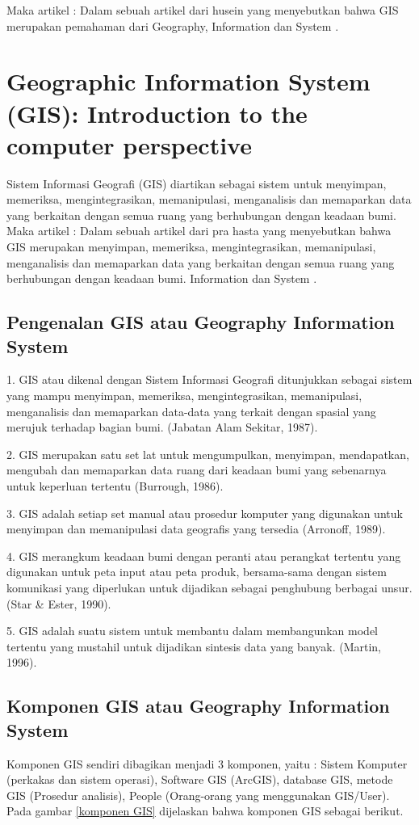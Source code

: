 Maka artikel :
	Dalam sebuah artikel dari husein yang menyebutkan bahwa  GIS merupakan pemahaman dari
	Geography, Information dan System \cite{husein2006konsep}.

\section{Geographic Information System (GIS): Introduction to the computer perspective}
Sistem Informasi Geografi (GIS) diartikan sebagai sistem untuk menyimpan, memeriksa, 
mengintegrasikan, memanipulasi, menganalisis dan memaparkan data yang berkaitan dengan semua 
ruang yang berhubungan dengan keadaan bumi.
Maka artikel :
	Dalam sebuah artikel dari pra hasta yang menyebutkan bahwa  GIS merupakan menyimpan, memeriksa, mengintegrasikan, memanipulasi, menganalisis dan memaparkan data yang berkaitan dengan semua ruang yang berhubungan dengan keadaan bumi. Information dan System \cite{prahasta2009sistem}.

\subsection{Pengenalan GIS atau Geography Information System}
1. GIS atau dikenal dengan Sistem Informasi Geografi ditunjukkan sebagai sistem yang mampu menyimpan, memeriksa, mengintegrasikan, memanipulasi, menganalisis dan memaparkan data-data yang terkait dengan spasial yang merujuk terhadap bagian bumi. (Jabatan Alam Sekitar, 1987).

2. GIS merupakan satu set lat untuk mengumpulkan, menyimpan, mendapatkan, mengubah dan memaparkan data ruang dari keadaan bumi yang sebenarnya untuk keperluan tertentu (Burrough, 1986).

3. GIS adalah setiap set manual atau prosedur komputer yang digunakan untuk menyimpan dan memanipulasi data geografis yang tersedia (Arronoff, 1989).

4. GIS merangkum keadaan bumi dengan peranti atau perangkat tertentu yang digunakan untuk peta input atau peta produk, bersama-sama dengan sistem komunikasi yang diperlukan untuk dijadikan sebagai penghubung berbagai unsur. (Star \& Ester, 1990).

5. GIS adalah suatu sistem untuk membantu dalam membangunkan model tertentu yang mustahil untuk dijadikan sintesis data yang banyak. (Martin, 1996).

\subsection{Komponen GIS atau Geography Information System}
Komponen GIS sendiri dibagikan menjadi 3 komponen, yaitu :
Sistem Komputer (perkakas dan sistem operasi), Software GIS
(ArcGIS), database GIS, metode GIS (Prosedur analisis), People (Orang-orang yang menggunakan GIS/User).
Pada gambar \ref{komponen GIS} dijelaskan bahwa komponen GIS sebagai berikut.

